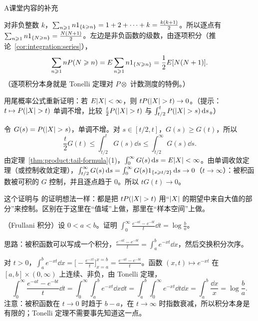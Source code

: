 \begin{exercises}{A}{课堂内容的补充}
\begin{solution}
对非负整数 $k$，$\sum_{n\geqslant1}n1_{\{k\geqslant n\}}=1+2+\cdots+k=\frac{k(k+1)}2$。所以逐点有 $\sum_{n\geqslant1}n1_{\{N\geqslant n\}}=\frac{N(N+1)}2$。左边是非负函数的级数，由逐项积分（推论~\ref{cor:integration:series}），
\[
\sum_{n\geqslant1}nP(N\geqslant n)=E\sum_{n\geqslant1}n1_{\{N\geqslant n\}}=\frac12E[N(N+1)].
\]
（逐项积分本身就是 Tonelli 定理对 $P\otimes$ 计数测度的特例。）
\end{solution}

\item\label{ex:product:A6} 用尾概率公式重新证明：若 $E\lvert X\rvert<\infty$，则 $tP(\lvert X\rvert>t)\to0$。（提示：$t\mapsto P(\lvert X\rvert>t)$ 单调不增，比较 $\frac t2P(\lvert X\rvert>t)$ 与 $\int_{t/2}^tP(\lvert X\rvert>s)\,\mathrm{d} s$。）
\begin{solution}
令 $G(s)=P(\lvert X\rvert>s)$，单调不增。对 $s\in[t/2,t]$，$G(s)\geqslant G(t)$，所以
\[
\frac t2G(t)\leqslant\int_{t/2}^tG(s)\dd s\leqslant\int_{t/2}^\infty G(s)\dd s .
\]
由定理~\ref{thm:product:tail-formula}(1)，$\int_0^\infty G(s)\,\mathrm{d} s=E\lvert X\rvert<\infty$。由单调收敛定理（或控制收敛定理），$\int_{t/2}^\infty G(s)\,\mathrm{d} s=\int_0^\infty G(s)1_{\{s\geqslant t/2\}}\,\mathrm{d} s\to0$（$t\to\infty$）：被积函数被可积的 $G$ 控制，并且逐点趋于 $0$。所以 $tG(t)\to0$。

这个证明与 的证明想法一样：都是把 $tP(\lvert X\rvert>t)$ 用“$\lvert X\rvert$ 的期望中来自大值的部分”来控制。区别在于这里在“值域”上做，那里在“样本空间”上做。
\end{solution}

\item\label{ex:product:A7} （Frullani 积分）设 $0<a<b$。证明 $\displaystyle\int_0^\infty\frac{e^{-at}-e^{-bt}}t\dd t=\log\frac ba$。
\begin{solution}
思路：被积函数可以写成一个积分，$\frac{e^{-at}-e^{-bt}}t=\int_a^be^{-xt}\dd x$，然后交换积分次序。

对 $t>0$，$\int_a^be^{-xt}\dd x=\bigl[-\frac{e^{-xt}}t\bigr]_{x=a}^{x=b}=\frac{e^{-at}-e^{-bt}}t$。函数 $(x,t)\mapsto e^{-xt}$ 在 $[a,b]\times(0,\infty)$ 上连续、非负，由 Tonelli 定理，
\[
\int_0^\infty\frac{e^{-at}-e^{-bt}}t\dd t=\int_0^\infty\int_a^be^{-xt}\dd x\dd t=\int_a^b\int_0^\infty e^{-xt}\dd t\dd x=\int_a^b\frac{\dd x}x=\log\frac ba .
\]
注意：被积函数在 $t\to0$ 时趋于 $b-a$，在 $t\to\infty$ 时指数衰减，所以积分本身是有限的；Tonelli 定理不需要事先知道这一点。
\end{solution}
\end{exercises}

